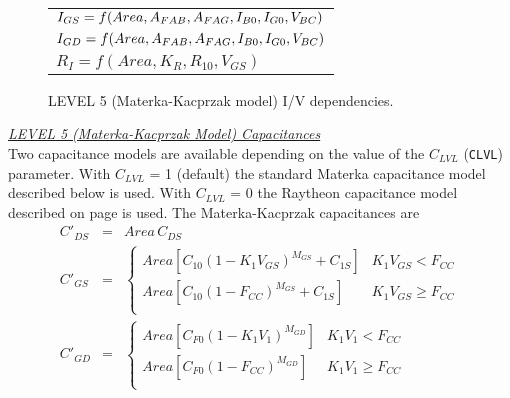 \begin{figure}[h]
\begin{tabular}[t]{|p{1.8in}|}
$I_{GS} = f(Area, A_{FAB}, A_{FAG},
       \newline\hspace*{\fill} I_{B0}, I_{G0}, V_{BC})$ \\
$I_{GD} = f(Area, A_{FAB}, A_{FAG},
       \newline\hspace*{\fill} I_{B0}, I_{G0}, V_{BC})$ \\
$R_I =  f(Area, K_R, R_{10}, V_{GS})$ \\
\hline
\end{tabular}
\caption{LEVEL 5 (Materka-Kacprzak model) I/V dependencies. \label{bleve51i/v}}
\end{figure}

\noindent\underline{\sl LEVEL 5 (Materka-Kacprzak Model) Capacitances}\\[0.1in]
Two capacitance models are available depending on the value of the $C_{LVL}$
({\tt CLVL}) parameter.  With $C_{LVL}$ = 1 (default) the standard Materka
capacitance model described below is used.
With $C_{LVL}$ = 0 the Raytheon capacitance model
described on page \pageref{b:raytheon:capacitance} is used.
The Materka-Kacprzak capacitances are
\begin{eqnarray}
C'_{DS}&=&Area\, C_{DS} \\
C'_{GS}&=&\left\{ \begin{array}{ll}
         Area \left[ C_{10}( 1 - K_1 V_{GS} )^{M_{GS}} + C_{1S} \right]
           & K_1V_{GS} < F_{CC}\\
         Area \left[ C_{10}( 1 - F_{CC} )^{M_{GS}} + C_{1S} \right]
           & K_1V_{GS} \ge F_{CC}\\
         \end{array} \right. \\ %
C'_{GD}&=&\left\{ \begin{array}{ll}
         Area \left[ C_{F0}( 1 - K_1 V_1 )^{M_{GD}} \right]
           & K_1V_1 < F_{CC}\\
         Area \left[ C_{F0}( 1 - F_{CC} )^{M_{GD}} \right]
           & K_1V_1 \ge F_{CC}\\
         \end{array} \right. %
\end{eqnarray}

